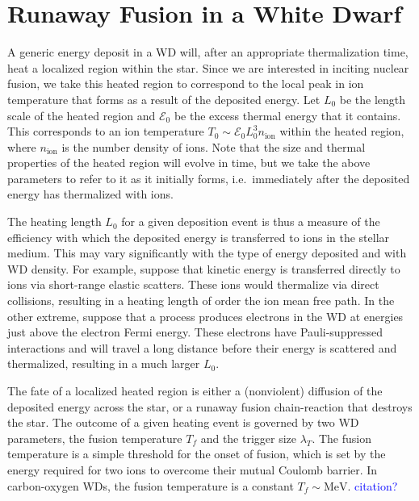 \documentclass[twocolumn,showpacs,preprintnumbers,amsmath,amssymb,prd]{revtex4}
\newcommand{\Ez}{\mathcal{E}_0}
\newcommand{\MeV}{\text{MeV}}
\begin{document}
\section{Runaway Fusion in a White Dwarf}
\label{sec:Review}

A generic energy deposit in a WD will, after an appropriate thermalization time, heat a localized region within the star. 
Since we are interested in inciting nuclear fusion, we take this heated region to correspond to the local peak in ion temperature that forms as a result of the deposited energy. 
Let $L_0$ be the length scale of the heated region and $\Ez$ be the excess thermal energy that it contains.
This corresponds to an ion temperature $T_0 \sim \Ez L_0^3 n_\text{ion}$ within the heated region, where $n_\text{ion}$ is the number density of ions.
Note that the size and thermal properties of the heated region will evolve in time, but we take the above parameters to refer to it as it initially forms, i.e.\ immediately after the deposited energy has thermalized with ions.  

The heating length $L_0$ for a given deposition event is thus a measure of the efficiency with which the deposited energy is transferred to ions in the stellar medium.
This may vary significantly with the type of energy deposited and with WD density.
For example, suppose that kinetic energy is transferred directly to ions via short-range elastic scatters.
These ions would thermalize via direct collisions, resulting in a heating length of order the ion mean free path.
In the other extreme, suppose that a process produces electrons in the WD at energies just above the electron Fermi energy.
These electrons have Pauli-suppressed interactions and will travel a long distance before their energy is scattered and thermalized, resulting in a much larger $L_0$.

The fate of a localized heated region is either a (nonviolent) diffusion of the deposited energy across the star, or a runaway fusion chain-reaction that destroys the star.
The outcome of a given heating event is governed by two WD parameters, the fusion temperature $T_f$ and the trigger size $\lambda_T$.
The fusion temperature is a simple threshold for the onset of fusion, which is set by the energy required for two ions to overcome their mutual Coulomb barrier.
In carbon-oxygen WDs, the fusion temperature is a constant $T_f \sim \MeV$. \textcolor{blue}{citation?}
\end{document}
